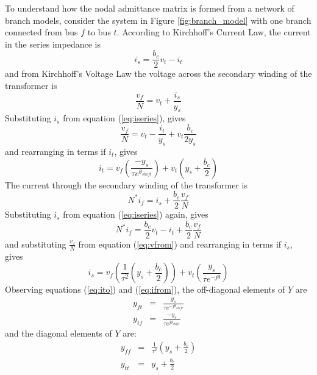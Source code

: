 
To understand how the nodal admittance matrix is formed from a network of branch
models, consider the system in Figure \ref{fig:branch_model} with one branch
connected from bus $f$ to bus $t$. According to Kirchhoff's Current Law, the
current in the series impedance is
\begin{equation}
\label{eq:iseries}
i_s = \frac{b_c}{2}v_t - i_t
\end{equation}
and from Kirchhoff's Voltage Law the voltage across the secondary winding of
the transformer is
\begin{equation}
\frac{v_{f}}{N} = v_t + \frac{i_s}{y_s}
\end{equation}
Substituting $i_s$ from equation (\ref{eq:iseries}), gives
\begin{equation}
\label{eq:vfrom}
\frac{v_{f}}{N} = v_t - \frac{i_t}{y_s} + v_t\frac{b_c}{2y_s}
\end{equation}
and rearranging in terms if $i_t$, gives
\begin{equation}
\label{eq:ito}
i_t = v_f \left( \frac{-y_s}{\tau e^{\theta_{shift}}} \right) +
v_t \left( y_s + \frac{b_c}{2} \right)
\end{equation}
The current through the secondary winding of the transformer is
\begin{equation}
N^*i_f = i_s + \frac{b_c}{2}\frac{v_{f}}{N}
\end{equation}
Substituting $i_s$ from equation (\ref{eq:iseries}) again, gives
\begin{equation}
N^*i_f = \frac{b_c}{2}v_t - i_t + \frac{b_c}{2}\frac{v_{f}}{N}
\end{equation}
and substituting $\frac{v_{f}}{N}$ from equation (\ref{eq:vfrom}) and
rearranging in terms if $i_s$, gives
\begin{equation}
\label{eq:ifrom}
i_s = v_f \left( \frac{1}{\tau^2} \left(y_s + \frac{b_c}{2}\right) \right) +
v_t \left(\frac{y_s}{\tau e^{-j\theta}}\right)
\end{equation}
Observing equations (\ref{eq:ito}) and (\ref{eq:ifrom}), the
off-diagonal elements of $Y$ are
\begin{eqnarray}
y_{ft}& =& \frac{y_s}{\tau e^{-j\theta_{shift}}}\\
y_{tf}& =& \frac{-y_s}{\tau e^{j\theta_{shift}}}
\end{eqnarray}
and the diagonal elements of $Y$ are:
\begin{eqnarray}
y_{ff}& =& \frac{1}{\tau^2} \left(y_s + \frac{b_c}{2}\right)\\
y_{tt}& =& y_s + \frac{b_c}{2}
\end{eqnarray}
